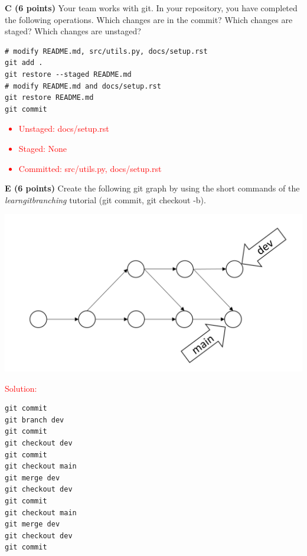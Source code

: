 \documentclass[12pt]{scrartcl}
\begin{document}
\vspace{0.3cm}

\textbf{C (6 points)} Your team works with git. In your repository, you have completed the following operations. Which changes are in the commit? Which changes are staged? Which changes are unstaged?

\begin{verbatim}
# modify README.md, src/utils.py, docs/setup.rst
git add .
git restore --staged README.md
# modify README.md and docs/setup.rst
git restore README.md
git commit
\end{verbatim}
\vspace{0.3cm}

\textcolor{red}{
	\begin{itemize}
		\item Unstaged: docs/setup.rst
		\item Staged: None
		\item Committed: src/utils.py, docs/setup.rst
	\end{itemize}
}

\newpage

\textbf{E (6 points)} Create the following git graph by using the short commands of the \textit{learngitbranching} tutorial (git commit, git checkout -b).

\vspace{1cm}
\begin{center}
	\includegraphics[scale=0.6]{git-graph_2.png}
\end{center}

\textcolor{red}{Solution:}
\begin{verbatim}
git commit
git branch dev
git commit
git checkout dev
git commit
git checkout main
git merge dev
git checkout dev
git commit
git checkout main
git merge dev
git checkout dev
git commit
\end{verbatim}
\end{document}
